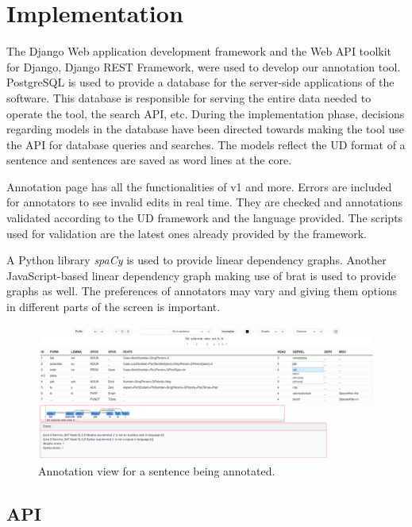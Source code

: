 \section{Implementation}
\label{sec:implementation}

The Django\cite{django} Web application development framework and the Web API toolkit for Django, Django REST Framework\cite{drf}, were used to develop our annotation tool.
PostgreSQL\cite{psql} is used to provide a database for the server-side applications of the software.
This database is responsible for serving the entire data needed to operate the tool, the search API, etc.
During the implementation phase, decisions regarding models in the database have been directed towards making the tool use the API for database queries and searches.
The models reflect the UD format of a sentence and sentences are saved as word lines at the core.

Annotation page has all the functionalities of \boat{} v1 and more.
Errors are included for annotators to see invalid edits in real time.
They are checked and annotations validated according to the UD framework and the language provided.
The scripts used for validation are the latest ones already provided by the framework.\cite{UD-git}

A Python library \textit{spaCy}\cite{spacy} is used to provide linear dependency graphs.
Another JavaScript-based linear dependency graph\cite{spyssalo} making use of brat\cite{brat-vis} is used to provide graphs as well.
The preferences of annotators may vary and giving them options in different parts of the screen is important.

\begin{figure}[tbh]
    \centering
    \includegraphics[width=1\textwidth]{figures/1.png}
    \caption{Annotation view for a sentence being annotated.}
    \label{fig:demo-fig}
\end{figure}

\subsection{API}
\label{sec:api}

